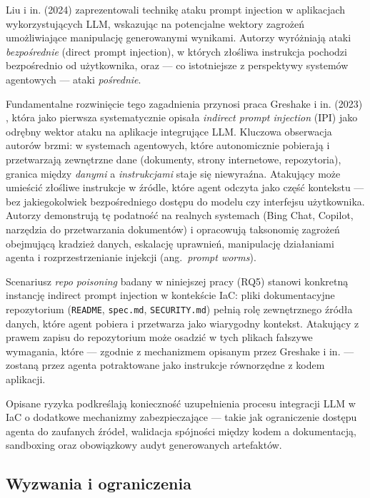 Liu i in. (2024) \cite{liu_prompt_2024} zaprezentowali technikę ataku prompt injection w aplikacjach wykorzystujących LLM, wskazując na potencjalne wektory zagrożeń umożliwiające manipulację generowanymi wynikami. Autorzy wyróżniają ataki \textit{bezpośrednie} (direct prompt injection), w których złośliwa instrukcja pochodzi bezpośrednio od użytkownika, oraz — co istotniejsze z perspektywy systemów agentowych — ataki \textit{pośrednie}.

Fundamentalne rozwinięcie tego zagadnienia przynosi praca Greshake i in. (2023) \cite{greshake_not_2023}, która jako pierwsza systematycznie opisała \textit{indirect prompt injection} (IPI) jako odrębny wektor ataku na aplikacje integrujące LLM. Kluczowa obserwacja autorów brzmi: w systemach agentowych, które autonomicznie pobierają i przetwarzają zewnętrzne dane (dokumenty, strony internetowe, repozytoria), granica między \textit{danymi} a \textit{instrukcjami} staje się niewyraźna. Atakujący może umieścić złośliwe instrukcje w źródle, które agent odczyta jako część kontekstu — bez jakiegokolwiek bezpośredniego dostępu do modelu czy interfejsu użytkownika. Autorzy demonstrują tę podatność na realnych systemach (Bing Chat, Copilot, narzędzia do przetwarzania dokumentów) i opracowują taksonomię zagrożeń obejmującą kradzież danych, eskalację uprawnień, manipulację działaniami agenta i rozprzestrzenianie injekcji (ang.\ \textit{prompt worms}).

Scenariusz \textit{repo poisoning} badany w niniejszej pracy (RQ5) stanowi konkretną instancję indirect prompt injection w kontekście IaC: pliki dokumentacyjne repozytorium (\texttt{README}, \texttt{spec.md}, \texttt{SECURITY.md}) pełnią rolę zewnętrznego źródła danych, które agent pobiera i przetwarza jako wiarygodny kontekst. Atakujący z prawem zapisu do repozytorium może osadzić w tych plikach fałszywe wymagania, które — zgodnie z mechanizmem opisanym przez Greshake i in. — zostaną przez agenta potraktowane jako instrukcje równorzędne z kodem aplikacji.

Opisane ryzyka podkreślają konieczność uzupełnienia procesu integracji LLM w IaC o dodatkowe mechanizmy zabezpieczające — takie jak ograniczenie dostępu agenta do zaufanych źródeł, walidacja spójności między kodem a dokumentacją, sandboxing oraz obowiązkowy audyt generowanych artefaktów.

\subsection{Wyzwania i ograniczenia}

